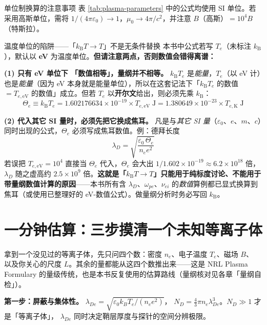 \documentclass[12pt,a4paper,openany,oneside]{book}
\newcommand{\eps}{\varepsilon}
\begin{document}
\begin{insight}{单位制换算的注意事项}{}
表 \ref{tab:plasma-parameters} 中的公式均使用 SI 单位。若采用高斯单位，需将 $1/(4\pi\eps_0)\to 1$，$\mu_0\to 4\pi/c^2$，并注意 $B$（高斯）$=10^4 B$（特斯拉）。
\end{insight}

\begin{warning}{温度单位的陷阱——「$k_\mathrm{B}T\to T$」不是无条件替换}{}
本书中公式若写 $T_e$（未标注 $k_\mathrm{B}$），默认以 \textbf{eV} 为温度单位。\textbf{但请注意两点，否则数值会错得离谱：}

\textbf{(1) 只有 eV 单位下 「数值相等」，量纲并不相等。} $k_\mathrm{B}T_e$ 是\emph{能量}，$T_e$（以 eV 计）也是\emph{能量}（因为 eV 本身就是能量单位），所以在这套记法下「$k_\mathrm{B}T_e$ 的数值 $=T_{e,\mathrm{eV}}$ 的数值」成立。但若 $T_e$ 以\textbf{开尔文}给出，则必须先乘 $k_\mathrm{B}$：
\[
\Theta_e \equiv k_\mathrm{B}T_e = 1.602176634\times 10^{-19}\times T_{e,\mathrm{eV}}\;\mathrm{J}
= 1.380649\times 10^{-23}\times T_{e,\mathrm{K}}\;\mathrm{J}
\]

\textbf{(2) 代入其它 SI 量时，必须先把它换成焦耳。} 凡是与\emph{其它 SI 量}（$\eps_0$、$e$、$m$、$c$）同时出现的公式，$\Theta_e$ 必须写成焦耳数值。例：德拜长度
\[
\lambda_D = \sqrt{\frac{\eps_0\,\Theta_e}{n_ee^2}}
\]
若误把 $T_{e,\mathrm{eV}}=10^4$ 直接当 $\Theta_e$ 代入，$\Theta_e$ 会大出 $1/1.602\times10^{-19}\approx6.2\times10^{18}$ 倍，$\lambda_D$ 随之虚高约 $2.5\times10^{9}$ 倍。\textbf{这就是「$k_\mathrm{B}T\to T$」只能用于纯标度讨论、不能用于带量纲数值计算的原因}——本书所有含 $\lambda_D$、$\omega_{pe}$、$\nu_{ei}$ 的\emph{数值}算例都已显式换算到焦耳（或使用已整理好的 eV-数值公式）。做量纲分析时务必写回 $k_\mathrm{B}$。
\end{warning}


\section{一分钟估算：三步摸清一个未知等离子体}

拿到一个没见过的等离子体，先只问四个数：密度 $n_e$、电子温度 $T_e$、磁场 $B$、
以及你关心的尺度 $L$。其余的量都能从这四个数推出来——这是 NRL Plasma Formulary
的量级传统，也是本书反复使用的估算路线（量纲核对见各章「量纲自检」）。

\textbf{第一步：屏蔽与集体性。} $\lambda_{De}=\sqrt{\varepsilon_0k_BT_e/(n_ee^2)}$，
$N_D=\frac{4}{3}\pi n_e\lambda_{De}^3$。$N_D\gg1$ 才是「等离子体」，
$\lambda_{De}$ 同时决定鞘层厚度与探针的空间分辨极限。
\end{document}
